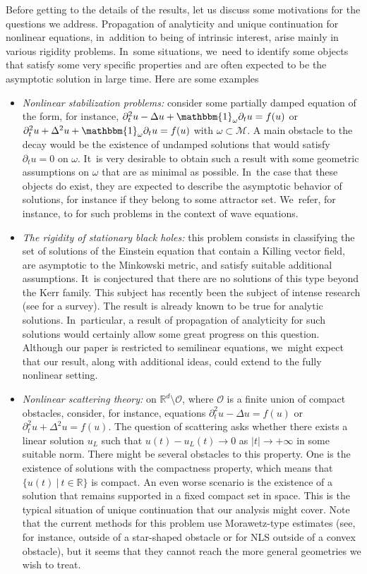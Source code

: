 \documentclass[10pt]{amsart}
\theoremstyle{definition}
\let\mc\mathcal
\newcommand{\M}{\mc{M}}
\newcommand{\R}{\mathbb{R}}
\begin{document}
Before getting to the details of the results, let us discuss some motivations for the questions we address. Propagation of analyticity and unique continuation for nonlinear equations, in~addition to being of intrinsic interest, arise mainly in various rigidity problems. In~some situations, we~need to identify some objects that satisfy some very specific properties and are often expected to be the asymptotic solution in large time. Here are some examples
\begin{itemize}
\item \emph{Nonlinear stabilization problems:} consider some partially damped equation of the form, for instance, $\partial_t^2u-\Delta u+\mathbbm{1}_{\omega}\partial_t u=f(u)$ or $\partial_t^2u+\Delta^2 u+\mathbbm{1}_{\omega}\partial_t u=f(u)$ with $\omega \subset \M$. A main obstacle to the decay would be the existence of undamped solutions that would satisfy $\partial_t u=0$ on $\omega$. It~is very desirable to obtain such a result with some geometric assumptions on $\omega$ that are as minimal as possible. In~the case that these objects do exist, they are expected to describe the asymptotic behavior of solutions, for instance if they belong to some attractor set. We~refer, for instance, to \cite{Z:91,DLZ03,JL13,L:11} for such problems in the context of wave equations.
\item \emph{The rigidity of stationary black holes:} this problem consists in classifying the set of solutions of the Einstein equation that contain a Killing vector field, are asymptotic to the Minkowski metric, and satisfy suitable additional assumptions. It~is conjectured that there are no solutions of this type beyond the Kerr family. This subject has recently been the subject of intense research (see \cite{IK:15} for a survey). The result is already known to be true for analytic solutions. In~particular, a result of propagation of analyticity for such solutions would certainly allow some great progress on this question. Although our paper is restricted to semilinear equations, we~might expect that our result, along with additional ideas, could extend to the fully nonlinear setting.
\item \emph{Nonlinear scattering theory:} on $\R^d\setminus \mathcal{O}$, where $\mathcal{O}$ is a finite union of compact obstacles, consider, for instance, equations $\partial_t^2u-\Delta u=f(u)$ or $\partial_t^2u+\Delta^2 u=f(u)$. The question of scattering asks whether there exists a linear solution $u_L$ such that $u(t)-u_L(t)\to 0$ as $|t|\to+\infty$ in some suitable norm. There might be several obstacles to this property. One is the existence of solutions with the compactness property, which means that $\{u(t)\ |\ t\in\R\}$ is compact. An even worse scenario is the existence of a solution that remains supported in a fixed compact set in space. This is the typical situation of unique continuation that our analysis might cover. Note that the current methods for this problem use Morawetz-type estimates (see, for instance, \cite{BSS:09} outside of a star-shaped obstacle or \cite{KVZ:16} for NLS outside of a convex obstacle), but it seems that they cannot reach the more general geometries we wish to treat.
\end{itemize}
\end{document}
